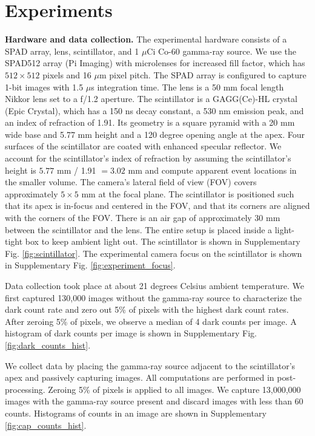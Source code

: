 \section{Experiments}
\textbf{Hardware and data collection.}
The experimental hardware consists of a SPAD array, lens, scintillator, and 1 $\mu$Ci Co-60 gamma-ray source.
We use the SPAD512 array (Pi Imaging) with microlenses for increased fill factor, 
which has $512 \times 512$ pixels and 16 $\mu$m pixel pitch.
The SPAD array is configured to capture 1-bit images with 1.5 $\mu$s 
integration time.
The lens is a 50 mm focal length Nikkor lens set to a f/1.2 aperture.
The scintillator is a GAGG(Ce)-HL crystal (Epic Crystal), which has a 150 ns decay 
constant, a 530 nm emission peak, and an index of refraction of 1.91.
Its geometry is a square pyramid with a 20 mm wide base and 5.77 mm 
height and a 120 degree opening angle at the apex.
Four surfaces of the scintillator are coated with enhanced specular reflector.
We account for the scintillator's index of refraction by assuming the 
scintillator's height is $5.77$ mm  / 1.91 $=3.02$ mm and compute apparent event 
locations in the smaller volume.
The camera's lateral field of view (FOV) covers approximately $5 \times 5$ mm at 
the focal plane.
The scintillator is positioned such that its apex is in-focus and centered in the 
FOV, and that its corners are aligned with the corners of the FOV. 
There is an air gap of approximately 30 mm between the scintillator and the lens.
The entire setup is placed inside a light-tight box to keep ambient light out.
The scintillator is shown in Supplementary Fig. \ref*{fig:scintillator}.
The experimental camera focus on the scintillator is shown in Supplementary Fig. \ref*{fig:experiment_focus}. 

Data collection took place at about 21 degrees Celsius ambient temperature.
We first captured 130,000 images without the gamma-ray source to characterize the 
dark count rate and zero out 5\% of pixels with the highest dark count rates.
After zeroing 5\% of pixels, we observe a median of 4 dark counts per image.
A histogram of dark counts per image is shown in Supplementary Fig. \ref*{fig:dark_counts_hist}.

We collect data by placing the gamma-ray source adjacent to the scintillator's 
apex and passively capturing images.
All computations are performed in post-processing.
Zeroing 5\% of pixels is applied to all images.
We capture 13,000,000 images with the gamma-ray source present and 
discard images with less than 60 counts.
Histograms of counts in an image are shown in Supplementary \cref*{fig:cap_counts_hist}.

